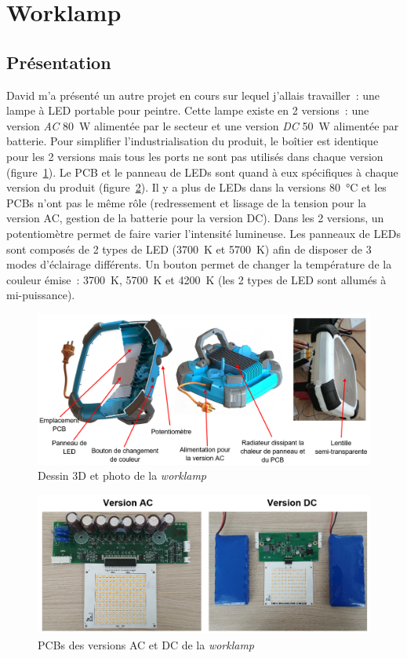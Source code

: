 \documentclass[a4paper, 12pt, sffamily]{report}
\begin{document}
\section{Worklamp}
\subsection{Présentation}
David m’a présenté un autre projet en cours sur lequel j'allais travailler~: une lampe à LED portable pour peintre. Cette lampe existe en 2 versions~: une version \emph{AC} \SI{80}{\watt} alimentée par le secteur et une version \emph{DC} \SI{50}{\watt} alimentée par batterie. Pour simplifier l'industrialisation du produit, le boîtier est identique pour les 2 versions mais tous les ports ne sont pas utilisés dans chaque version (figure~\ref{fig:captioned_worklamp}). Le PCB et le panneau de LEDs sont quand à eux spécifiques à chaque version du produit (figure~\ref{fig:worklamp_PCBs}). Il y a plus de LEDs dans la versions \SI{80}{\celsius} et les PCBs n'ont pas le même rôle (redressement et lissage de la tension pour la version AC, gestion de la batterie pour la version DC).
Dans les 2 versions, un potentiomètre permet de faire varier l'intensité lumineuse. Les panneaux de LEDs sont composés de 2 types de LED (\SI{3700}{\kelvin} et \SI{5700}{\kelvin}) afin de disposer de 3 modes d’éclairage différents. Un bouton permet de changer la température de la couleur émise~: \SI{3700}{\kelvin}, \SI{5700}{\kelvin} et \SI{4200}{\kelvin} (les 2 types de LED sont allumés à mi-puissance). 

\begin{figure}[H]
\centering
\includegraphics[scale=0.45]{figures/screenshots/captioned_worklamp.png}
\caption{Dessin 3D et photo de la \emph{worklamp}}
\label{fig:captioned_worklamp}
\end{figure}

\begin{figure}[H]
\centering
\includegraphics[scale=0.43]{figures/photos/worklamp_PCBs.jpg}
\caption{PCBs des versions AC et DC de la \emph{worklamp}}
\label{fig:worklamp_PCBs}
\end{figure}
\end{document}
